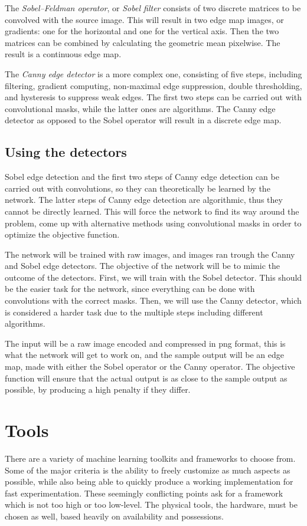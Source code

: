 \documentclass[12pt]{report}
\begin{document}
The \textit{Sobel–Feldman operator}, or \textit{Sobel filter} \cite{sobel} consists of two discrete matrices to be convolved with the source image. This will result in two edge map images, or gradients: one for the horizontal and one for the vertical axis. Then the two matrices can be combined by calculating the geometric mean pixelwise. The result is a continuous edge map.

The \textit{Canny edge detector} \cite{canny} is a more complex one, consisting of five steps, including filtering, gradient computing, non-maximal edge suppression, double thresholding, and hysteresis to suppress weak edges. The first two steps can be carried out with convolutional masks, while the latter ones are algorithms. The Canny edge detector as opposed to the Sobel operator will result in a discrete edge map.
\subsection{Using the detectors}
Sobel edge detection and the first two steps of Canny edge detection can be carried out with convolutions, so they can theoretically be learned by the network. The latter steps of Canny edge detection are algorithmic, thus they cannot be directly learned.
This will force the network to find its way around the problem, come up with alternative methods using convolutional masks in order to optimize the objective function.

The network will be trained with raw images, and images ran trough the Canny and Sobel edge detectors. The objective of the network will be to mimic the outcome of the detectors. First, we will train with the Sobel detector. This should be the easier task for the network, since everything can be done with convolutions with the correct masks. Then, we will use the Canny detector, which is considered a harder task due to the multiple steps including different algorithms.

The input will be a raw image encoded and compressed in png format, this is what the network will get to work on, and the sample output will be an edge map, made with either the Sobel operator or the Canny operator. The objective function will ensure that the actual output is as close to the sample output as possible, by producing a high penalty if they differ.
\section{Tools}
There are a variety of machine learning toolkits and frameworks to choose from. Some of the major criteria is the ability to freely customize as much aspects as possible, while also being able to quickly produce a working implementation for fast experimentation. These seemingly conflicting points ask for a framework which is not too high or too low-level. The physical tools, the hardware, must be chosen as well, based heavily on availability and possessions.
\end{document}
